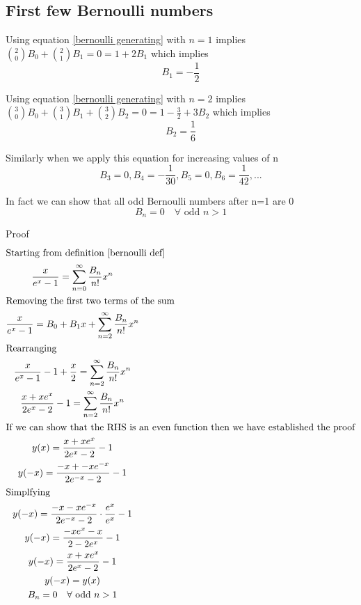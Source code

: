 \documentclass[a4paper]{article}
\begin{document}

\subsection{First few Bernoulli numbers}
Using equation \ref{bernoulli generating} with $n=1$ implies $ \binom{2}{0} B_0 + \binom{2}{1} B_1 = 0 = 1 + 2 B_1 $ which implies 
\begin{equation}
B_1 = -\frac{1}{2}
\end{equation}
 
Using equation \ref{bernoulli generating} with $n=2$ implies $ \binom{3}{0} B_0 + \binom{3}{1} B_1 + \binom{3}{2} B_2 = 0 = 1 - \frac{3}{2} + 3 B_2 $ which implies 
\begin{equation}
B_2 = \frac{1}{6}
\end{equation}

Similarly when we apply this equation for increasing values of n
\begin{equation}
B_3 = 0, B_4 = -\frac{1}{30}, B_5 = 0, B_6 = \frac{1}{42}, ...
\end{equation}


\begin{theorem}
In fact we can show that all odd Bernoulli numbers after n=1 are 0
\begin{equation} \label{odd bernoulli} B_n = 0  \quad \forall \text{ odd }n > 1
\end{equation}

Proof
\begin{gather*}
\intertext{Starting from definition \ref{bernoulli def}}
\frac{x}{e^x -1} = \sum_{n=0}^{\infty} \frac{B_n}{n!} x^n
\\
\intertext{Removing the first two terms of the sum}
\frac{x}{e^x -1} = B_0 + B_1 x + \sum_{n=2}^{\infty} \frac{B_n}{n!} x^n\\
\intertext{Rearranging}
\frac{x}{e^x -1}  - 1 + \frac{x}{2}= \sum_{n=2}^{\infty} \frac{B_n}{n!} x^n
\\
\frac{x + xe^x}{2e^x -2}  - 1 = \sum_{n=2}^{\infty} \frac{B_n}{n!} x^n
\\
\intertext{If we can show that the RHS is an even function then we have established the proof}
y(x) = \frac{x + xe^x}{2e^x -2}  - 1
\\
y(-x) = \frac{-x + -xe^{-x}}{2e^{-x} -2}  - 1
\\
\intertext{Simplfying}
y(-x) = \frac{-x -xe^{-x}}{2e^{-x} -2} \cdot \frac{e^x}{e^x}  - 1
\\
y(-x) = \frac{-xe^x -x}{2 -2e^x}  - 1
\\
y(-x) = \frac{x+xe^x}{2e^x - 2}  - 1
\\
y(-x) = y(x)
\\
B_n = 0  \quad \forall \text{ odd }n > 1
\end{gather*}
\end{theorem}
\end{document}
